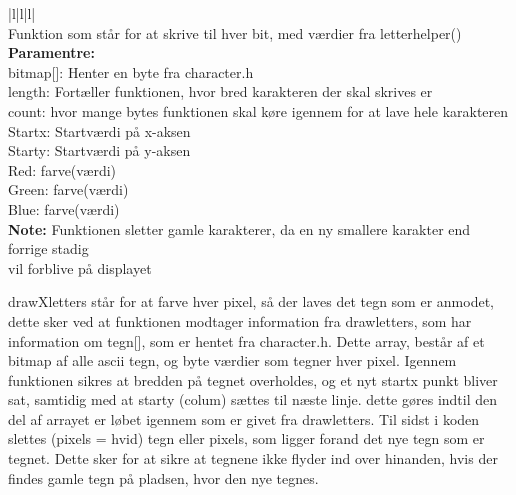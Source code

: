 \begin{center}
\begin{tabular}{ |l|l|l| }
\hline
{} \\
\hline
Funktion som står for at skrive til hver bit, med værdier fra letterhelper()\\
\hline
\textbf{Paramentre:}  \\bitmap[]: Henter en byte fra character.h\\ length: Fortæller funktionen, hvor bred karakteren der skal skrives er\\ count: hvor mange bytes funktionen skal køre igennem for at lave hele karakteren\\ Startx: Startværdi på x-aksen \\Starty: Startværdi på y-aksen\\ Red: farve(værdi)\\ Green: farve(værdi) \\ Blue: farve(værdi)\\
\textbf{Note:} Funktionen sletter gamle karakterer, da en ny smallere karakter end forrige stadig\\ vil forblive på displayet\\

\hline
\end{tabular}
\end{center}  

drawXletters står for at farve hver pixel, så der laves det tegn som er anmodet, dette sker ved at funktionen modtager information fra drawletters, som har information om tegn[], som er hentet fra character.h. Dette array, består af et bitmap af alle ascii tegn, og byte værdier som tegner hver pixel. Igennem funktionen sikres at bredden på tegnet overholdes, og et nyt startx punkt bliver sat, samtidig med at starty (colum) sættes til næste linje. dette gøres indtil den del af arrayet er løbet igennem som er givet fra drawletters. Til sidst i koden slettes (pixels = hvid) tegn eller pixels, som ligger forand det nye tegn som er tegnet. Dette sker for at sikre at tegnene ikke flyder ind over hinanden, hvis der findes gamle tegn på pladsen, hvor den nye tegnes. 



